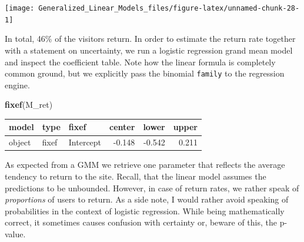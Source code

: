 \documentclass[]{svmono}
\newenvironment{Shaded}{\begin{snugshade}}{\end{snugshade}}
\newcommand{\KeywordTok}[1]{\textcolor[rgb]{0.13,0.29,0.53}{\textbf{#1}}}
\newcommand{\DataTypeTok}[1]{\textcolor[rgb]{0.13,0.29,0.53}{#1}}
\newcommand{\DecValTok}[1]{\textcolor[rgb]{0.00,0.00,0.81}{#1}}
\newcommand{\StringTok}[1]{\textcolor[rgb]{0.31,0.60,0.02}{#1}}
\newcommand{\CommentTok}[1]{\textcolor[rgb]{0.56,0.35,0.01}{\textit{#1}}}
\newcommand{\OperatorTok}[1]{\textcolor[rgb]{0.81,0.36,0.00}{\textbf{#1}}}
\newcommand{\NormalTok}[1]{#1}
\begin{document}
\begin{Shaded}
\end{Shaded}

\texttt{[image: Generalized\_Linear\_Models\_files/figure-latex/unnamed-chunk-28-1]}

In total, 46\% of the visitors return. In order to estimate the return
rate together with a statement on uncertainty, we run a logistic
regression grand mean model and inspect the coefficient table. Note how
the linear formula is completely common ground, but we explicitly pass
the binomial \texttt{family} to the regression engine.

\begin{Shaded}
\end{Shaded}

\begin{Shaded}
\begin{Highlighting}[]
\KeywordTok{fixef}\NormalTok{(M_ret)}
\end{Highlighting}
\end{Shaded}

\begin{longtable}[]{@{}lllrrr@{}}
\toprule
model & type & fixef & center & lower & upper\tabularnewline
\midrule
\endhead
object & fixef & Intercept & -0.148 & -0.542 & 0.211\tabularnewline
\bottomrule
\end{longtable}

As expected from a GMM we retrieve one parameter that reflects the
average tendency to return to the site. Recall, that the linear model
assumes the predictions to be unbounded. However, in case of return
rates, we rather speak of \emph{proportions} of users to return. As a
side note, I would rather avoid speaking of probabilities in the context
of logistic regression. While being mathematically correct, it sometimes
causes confusion with certainty or, beware of this, the p-value.
\end{document}
